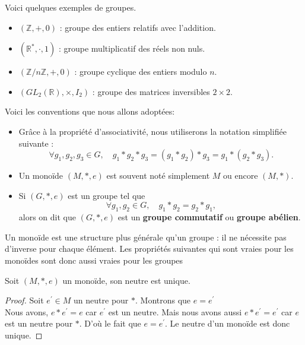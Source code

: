 \begin{exemple}
    Voici quelques exemples de groupes.
    \begin{itemize}
        \item \( (\mathbb{Z}, +, 0) \) : groupe des entiers relatifs avec l'addition.
        \item \( (\mathbb{R}^*, \cdot , 1) \) : groupe multiplicatif des réels non nuls.
        \item \( (\mathbb{Z}/n\mathbb{Z}, +, 0) \) : groupe cyclique des entiers modulo \( n \).
        \item \( (GL_2(\mathbb{R}), \times, I_2) \) : groupe des matrices inversibles \( 2 \times 2 \).
    \end{itemize}
\end{exemple}

\begin{notation}
    Voici les conventions que nous allons adoptées:
    \begin{itemize}
        \item Grâce à la propriété d'associativité, nous utiliserons la notation simplifiée suivante :  
        \[
        \forall g_1, g_2, g_3 \in G, \quad g_1 * g_2 * g_3 = (g_1 * g_2) * g_3 = g_1 * (g_2 * g_3).
        \]

        \item Un monoïde \( (M, *, e) \) est souvent noté simplement $M$ ou encore $(M,*)$.

        \item Si \( (G, *, e) \) est un groupe tel que  
        \[
        \forall g_1, g_2 \in G, \quad g_1 * g_2 = g_2 * g_1,
        \]
        alors on dit que \( (G, *, e) \) est un \textbf{groupe commutatif} ou \textbf{groupe abélien}.
    \end{itemize}
\end{notation}

\begin{remarque}
    Un monoïde est une structure plus générale qu'un groupe : il ne nécessite pas d'inverse pour chaque élément. Les propriétés suivantes qui sont vraies pour les monoïdes sont donc aussi vraies pour les groupes
\end{remarque}

\begin{proposition}
    Soit $(M,*,e)$ un monoïde, son neutre est unique.
\end{proposition}

\begin{proof}
    Soit $e^{'} \in M$ un neutre pour $*$.
    Montrons que $e=e^{'}$ \\Nous avons, $e*e^{'}=e$ car $e^{'}$ est un neutre. Mais nous avons aussi $e*e^{'}=e^{'}$ car $e$ est un neutre pour $*$.
    D'où le fait que $e=e^{'}$. Le neutre d'un monoïde est donc unique.
\end{proof}


